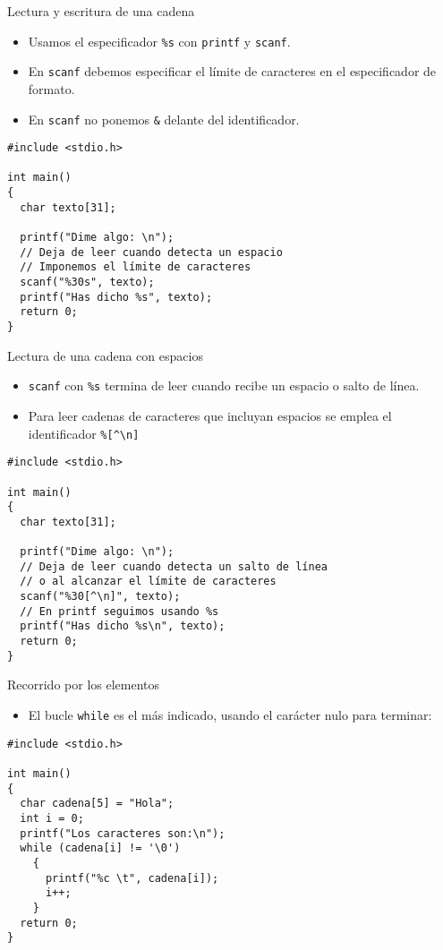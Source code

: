\documentclass[xcolor={usenames,svgnames,dvipsnames}, aspectratio=169]{beamer}
\begin{document}
\begin{frame}[label={sec:org623a9c8},fragile]{Lectura y escritura de una cadena}
 \begin{itemize}
\item Usamos el especificador \texttt{\%s} con \texttt{printf} y \texttt{scanf}.

\item En \texttt{scanf} \alert{debemos} especificar el \alert{límite de caracteres} en el especificador de formato.

\item En \texttt{scanf} \alert{no} ponemos \texttt{\&} delante del identificador.
\end{itemize}

\lstset{language=C,label= ,caption= ,captionpos=b,numbers=none}
\begin{lstlisting}
#include <stdio.h>

int main()
{
  char texto[31];

  printf("Dime algo: \n");
  // Deja de leer cuando detecta un espacio
  // Imponemos el límite de caracteres
  scanf("%30s", texto); 
  printf("Has dicho %s", texto);
  return 0;
}
\end{lstlisting}
\end{frame}

\begin{frame}[label={sec:org884208d},fragile]{Lectura de una cadena con espacios}
 \begin{itemize}
\item \texttt{scanf} con \texttt{\%s} termina de leer cuando recibe un espacio o salto de línea.
\item Para leer cadenas de caracteres que incluyan espacios se emplea el identificador \texttt{\%[\textasciicircum{}\textbackslash{}n]}
\end{itemize}
\lstset{language=C,label= ,caption= ,captionpos=b,numbers=none}
\begin{lstlisting}
#include <stdio.h>

int main()
{
  char texto[31];

  printf("Dime algo: \n");
  // Deja de leer cuando detecta un salto de línea
  // o al alcanzar el límite de caracteres
  scanf("%30[^\n]", texto);
  // En printf seguimos usando %s
  printf("Has dicho %s\n", texto);
  return 0;
}
\end{lstlisting}
\end{frame}
\begin{frame}[label={sec:orgd1b80fc},fragile]{Recorrido por los elementos}
 \begin{itemize}
\item El bucle \texttt{while} es el más indicado, usando el carácter nulo para terminar:
\end{itemize}

\lstset{language=C,label= ,caption= ,captionpos=b,numbers=none}
\begin{lstlisting}
#include <stdio.h>

int main()
{
  char cadena[5] = "Hola";
  int i = 0;
  printf("Los caracteres son:\n");
  while (cadena[i] != '\0')
    {
      printf("%c \t", cadena[i]);
      i++;
    }
  return 0;
}
\end{lstlisting}
\end{frame}
\end{document}
